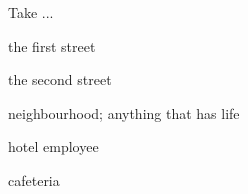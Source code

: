\begin{flashcard}{\LARGE Take ...}
\LARGE {}
\end{flashcard}
\begin{flashcard}{\LARGE the first street}
\LARGE {}
\end{flashcard}
\begin{flashcard}{\LARGE the second street}
\LARGE {}
\end{flashcard}
\begin{flashcard}{\LARGE neighbourhood; anything that has life}
\LARGE {}
\end{flashcard}
\begin{flashcard}{\LARGE hotel employee}
\LARGE {}
\end{flashcard}
\begin{flashcard}{\LARGE cafeteria}
\LARGE {}
\end{flashcard}

